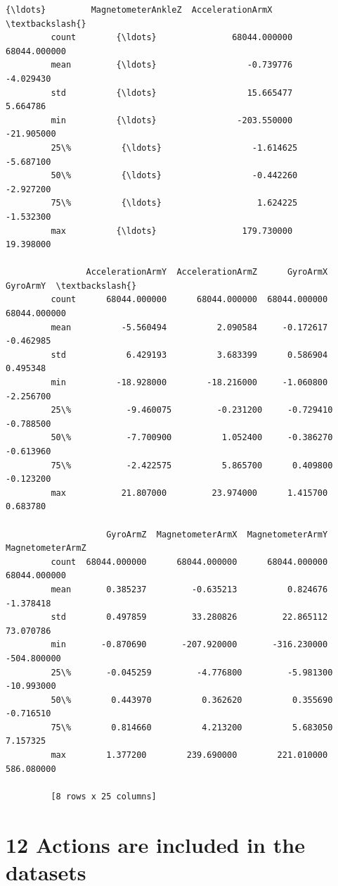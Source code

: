 \documentclass[11pt]{article}
\begin{document}
\begin{Verbatim}[commandchars=\\\{\}]
                      {\ldots}         MagnetometerAnkleZ  AccelerationArmX  \textbackslash{}
         count        {\ldots}               68044.000000      68044.000000   
         mean         {\ldots}                  -0.739776         -4.029430   
         std          {\ldots}                  15.665477          5.664786   
         min          {\ldots}                -203.550000        -21.905000   
         25\%          {\ldots}                  -1.614625         -5.687100   
         50\%          {\ldots}                  -0.442260         -2.927200   
         75\%          {\ldots}                   1.624225         -1.532300   
         max          {\ldots}                 179.730000         19.398000   
         
                AccelerationArmY  AccelerationArmZ      GyroArmX      GyroArmY  \textbackslash{}
         count      68044.000000      68044.000000  68044.000000  68044.000000   
         mean          -5.560494          2.090584     -0.172617     -0.462985   
         std            6.429193          3.683399      0.586904      0.495348   
         min          -18.928000        -18.216000     -1.060800     -2.256700   
         25\%           -9.460075         -0.231200     -0.729410     -0.788500   
         50\%           -7.700900          1.052400     -0.386270     -0.613960   
         75\%           -2.422575          5.865700      0.409800     -0.123200   
         max           21.807000         23.974000      1.415700      0.683780   
         
                    GyroArmZ  MagnetometerArmX  MagnetometerArmY  MagnetometerArmZ  
         count  68044.000000      68044.000000      68044.000000      68044.000000  
         mean       0.385237         -0.635213          0.824676         -1.378418  
         std        0.497859         33.280826         22.865112         73.070786  
         min       -0.870690       -207.920000       -316.230000       -504.800000  
         25\%       -0.045259         -4.776800         -5.981300        -10.993000  
         50\%        0.443970          0.362620          0.355690         -0.716510  
         75\%        0.814660          4.213200          5.683050          7.157325  
         max        1.377200        239.690000        221.010000        586.080000  
         
         [8 rows x 25 columns]
\end{Verbatim}
            
    \section{12 Actions are included in the
datasets}\label{actions-are-included-in-the-datasets}
\end{document}
